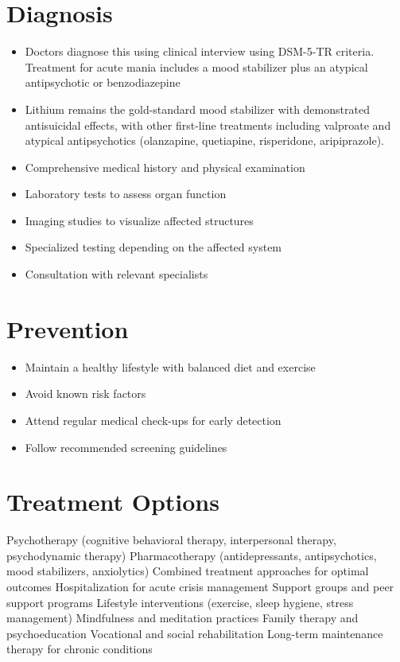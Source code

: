 \section{Diagnosis}
\begin{itemize}[noitemsep]
  \item Doctors diagnose this using clinical interview using DSM-5-TR criteria. Treatment for acute mania includes a mood stabilizer plus an atypical antipsychotic or benzodiazepine
  \item Lithium remains the gold-standard mood stabilizer with demonstrated antisuicidal effects, with other first-line treatments including valproate and atypical antipsychotics (olanzapine, quetiapine, risperidone, aripiprazole).
  \item Comprehensive medical history and physical examination
  \item Laboratory tests to assess organ function
  \item Imaging studies to visualize affected structures
  \item Specialized testing depending on the affected system
  \item Consultation with relevant specialists
\end{itemize}
\section{Prevention}
\begin{itemize}[noitemsep]
  \item Maintain a healthy lifestyle with balanced diet and exercise
  \item Avoid known risk factors
  \item Attend regular medical check-ups for early detection
  \item Follow recommended screening guidelines
\end{itemize}
\section{Treatment Options}
Psychotherapy (cognitive behavioral therapy, interpersonal therapy, psychodynamic therapy) Pharmacotherapy (antidepressants, antipsychotics, mood stabilizers, anxiolytics) Combined treatment approaches for optimal outcomes Hospitalization for acute crisis management Support groups and peer support programs Lifestyle interventions (exercise, sleep hygiene, stress management) Mindfulness and meditation practices Family therapy and psychoeducation Vocational and social rehabilitation Long-term maintenance therapy for chronic conditions

